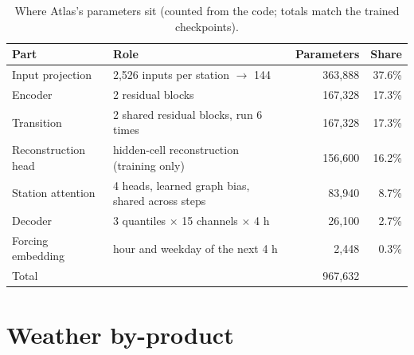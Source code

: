 \documentclass{article}
\newcommand{\trk}[1]{\textsc{#1}}
\begin{document}
\begin{table}[H]
\caption{Where Atlas's parameters sit (counted from the code; totals match the trained checkpoints).}
\label{tab:params}
\centering\small
\begin{tabular}{llrr}
\toprule
Part & Role & Parameters & Share \\
\midrule
Input projection & 2,526 inputs per station $\to$ 144 & 363,888 & 37.6\% \\
Encoder & 2 residual blocks & 167,328 & 17.3\% \\
Transition & 2 shared residual blocks, run 6 times & 167,328 & 17.3\% \\
Reconstruction head & hidden-cell reconstruction (training only) & 156,600 & 16.2\% \\
Station attention & 4 heads, learned graph bias, shared across steps & 83,940 & 8.7\% \\
Decoder & 3 quantiles $\times$ 15 channels $\times$ 4 h & 26,100 & 2.7\% \\
Forcing embedding & hour and weekday of the next 4 h & 2,448 & 0.3\% \\
\midrule
Total & & 967,632 & \\
\bottomrule
\end{tabular}
\end{table}

\section{Weather by-product}
\label{app:weather}

\begin{table}[H]
\caption{Atlas~v1.3's weather channels against global models' runs issued the day before each forecast hour, at the
CPCB stations measuring each variable (temperature 26, humidity 31, wind 29). MAE \trk{s} / \trk{u}. NOAA AIGFS and DWD
AICON have no public archive at these dates.}
\centering\small
{}
\end{table}
\end{document}
